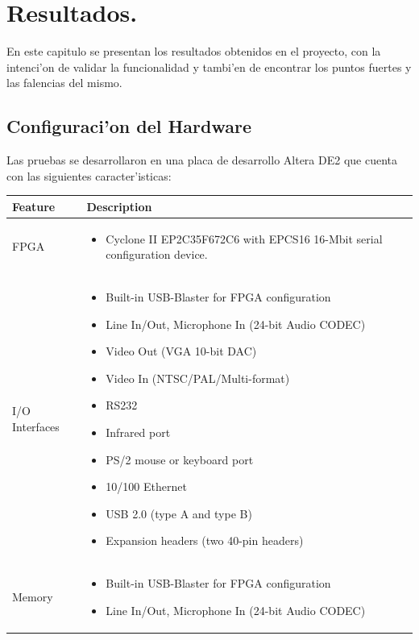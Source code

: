 \documentclass[12pt,spanish]{article}
\begin{document}
\section*{Resultados.}
En este capitulo se presentan los resultados obtenidos en el proyecto, con la intenci'on de validar la funcionalidad y tambi'en de encontrar los puntos fuertes y las falencias del mismo.

\subsection*{Configuraci'on del Hardware}
Las pruebas se desarrollaron en una placa de desarrollo Altera DE2 que cuenta con las siguientes caracter'isticas:


\begin{center}
	\begin{longtable}{|l|p{4.75in}|} \hline
		\textbf{Feature} & \textbf{Description} \\ \hline
		FPGA & \begin{itemize}
			\item Cyclone II EP2C35F672C6 with EPCS16 16-Mbit serial configuration device.
			\end{itemize} \\ \hline
		I/O Interfaces &     \begin{itemize}
					\item Built-in USB-Blaster for FPGA configuration
    					\item Line In/Out, Microphone In (24-bit Audio CODEC)
   					\item Video Out (VGA 10-bit DAC)
   					\item Video In (NTSC/PAL/Multi-format)
   					\item RS232
    					\item Infrared port
   					\item PS/2 mouse or keyboard port
    					\item 10/100 Ethernet
   					\item USB 2.0 (type A and type B)
    					\item Expansion headers (two 40-pin headers)
				     \end{itemize} \\ \hline
		Memory & \begin{itemize}
					\item Built-in USB-Blaster for FPGA configuration
    					\item Line In/Out, Microphone In (24-bit Audio CODEC)
    			 \end{itemize} \\ \hline

\end{longtable}
\end{center}
\end{document}
